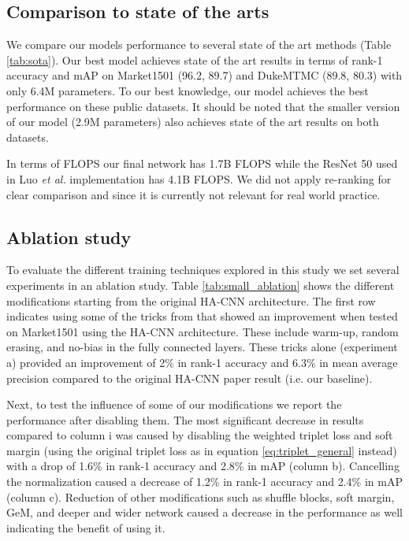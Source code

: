 \documentclass[sigconf]{acmart}
\begin{document}
\subsection{Comparison to state of the arts}
We compare our models performance to several state of the art methods (Table \ref{tab:sota}).
Our best model achieves state of the art results in terms of rank-1 accuracy and mAP on Market1501 (96.2, 89.7) and DukeMTMC (89.8, 80.3) with only 6.4M parameters.
To our best knowledge, our model achieves the best performance on these public datasets. It should be noted that the smaller version of our model (2.9M parameters) also achieves state of the art results on both datasets.

In terms of FLOPS our final network has 1.7B FLOPS while the ResNet 50 used in Luo \textit{et al.} \cite{luo2019bag} implementation has 4.1B FLOPS. We did not apply re-ranking for clear comparison and since it is currently not relevant for real world practice.

\subsection{Ablation study}
To evaluate the different training techniques explored in this study we set several experiments in an ablation study. Table \ref{tab:small_ablation} shows the different modifications starting from the original HA-CNN architecture. The first row indicates using some of the tricks from \cite{luo2019bag} that showed an improvement when tested on Market1501 using the HA-CNN architecture. These include warm-up, random erasing, and no-bias in the fully connected layers. These tricks alone (experiment a) provided an improvement of 2\% in rank-1 accuracy and 6.3\% in mean average precision compared to the original HA-CNN paper result (i.e. our baseline).

Next, to test the influence of some of our modifications we report the performance after disabling them. The most significant decrease in results compared to column i was caused by disabling the weighted triplet loss and soft margin (using the original triplet loss as in equation \eqref{eq:triplet_general} instead) with a drop of 1.6\% in rank-1 accuracy and 2.8\% in mAP (column b). Cancelling the  normalization caused a decrease of 1.2\% in rank-1 accuracy and 2.4\% in mAP (column c). Reduction of other modifications such as shuffle blocks, soft margin, GeM, and deeper and wider network caused a decrease in the performance as well indicating the benefit of using it.
\end{document}
